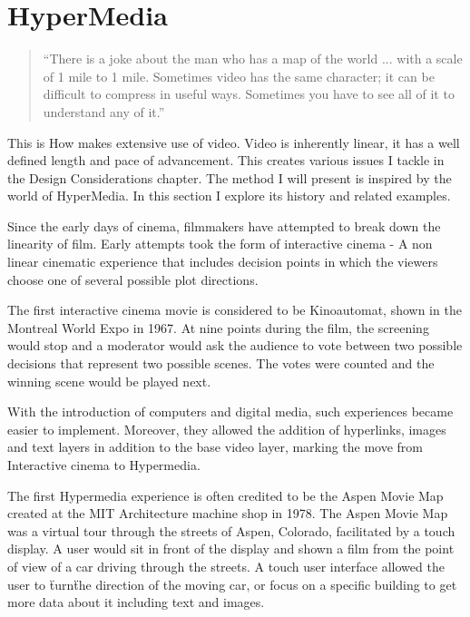 \section{HyperMedia}
\begin{quotation}
``There is a joke about the man who has a map of the world ... with a scale of 1 mile to 1 mile. Sometimes video has the same character; it can be difficult to compress in useful ways. Sometimes you have to see all of it to understand any of it.''  \cite{mackay1989eva}
\end{quotation}

This is How makes extensive use of video. Video is inherently linear, it has a well defined length and pace of advancement. This creates various issues I tackle in the Design Considerations chapter. The method I will present is inspired by the world of HyperMedia. In this section I explore its history and related examples.

Since the early days of cinema, filmmakers have attempted to break down the linearity of film. Early attempts took the form of interactive cinema - A non linear cinematic experience that includes decision points in which the viewers choose one of several possible plot directions.

The first interactive cinema movie is considered to be Kinoautomat\cite{cincera1967kinoautomat}, shown in the Montreal World Expo in 1967. At nine points during the film, the screening would stop and a moderator would ask the audience to vote between two possible decisions that represent two possible scenes. The votes were counted and the winning scene would be played next.    

With the introduction of computers and digital media, such experiences became easier to implement. Moreover, they allowed the addition of hyperlinks, images and text layers in addition to the base video layer, marking the move from Interactive cinema to Hypermedia.  

The first Hypermedia experience is often credited to be the Aspen Movie Map\cite{lippman1978aspen} created at the MIT Architecture machine shop in 1978. The Aspen Movie Map was a virtual tour through the streets of Aspen, Colorado, facilitated by a touch display. A user would sit in front of the display and shown a film from the point of view of a car driving through the streets. A touch user interface allowed the user to \"turn\" the direction of the moving car, or focus on a specific building to get more data about it including text and images. 


